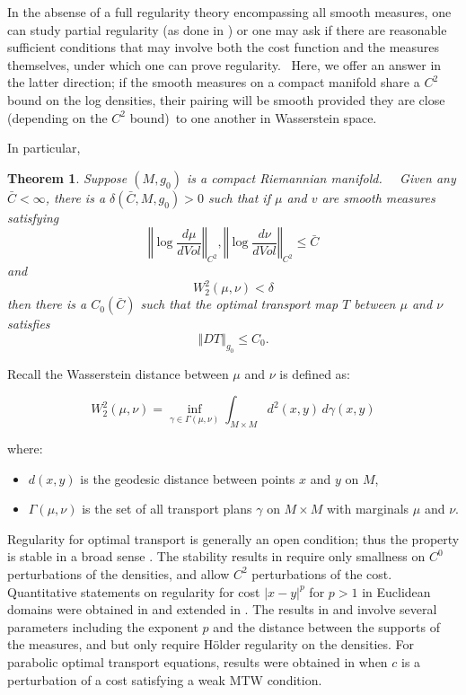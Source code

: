 \documentclass[11pt,letterpaper]{amsart}%
\newtheorem{theorem}{Theorem}
\numberwithin{equation}{section}
\begin{document}
In the absense of a full regularity theory encompassing all smooth measures, one can study partial regularity (as done in \cite{MR3349831}) or one may ask if there
are reasonable sufficient conditions that may involve both the cost function
and the measures themselves, under which one can prove regularity. \ Here, we
offer an answer in the latter direction; if the smooth measures on a compact manifold
share a $C^{2}$ bound on the log densities, their pairing will be smooth
provided they are close (depending on the $C^2$ bound)\ to one another in
Wasserstein space. 



In particular,

\begin{theorem}\label{main}
Suppose $\left(  M,g_{0}\right)  $ is a compact Riemannian manifold. \ \ Given
any $\bar{C}< \infty $, there is a $\delta(\bar{C},M,g_{0})>0 $ such that if $\mu$ and
$v$ are smooth measures satisfying
\[
\left\Vert \log\frac{d\mu}{dVol}\right\Vert _{C^{2}},\left\Vert \log\frac
{d\nu}{dVol}\right\Vert _{C^{2}}\leq\bar{C}%
\]
and
\[
W_2^{2}(\mu,\nu)<\delta
\]
then there is a $C_{0}(\bar{C})$ such that the optimal transport map $T$
between $\mu$ and $\nu$ satisfies%
\[
\left\Vert DT\right\Vert _{g_{0}}\leq C_{0}.
\]

\end{theorem}

Recall the Wasserstein distance between $\mu$ and $\nu$ is defined as:

\[
W_2^2(\mu, \nu) = \inf_{\gamma \in \Gamma(\mu, \nu)} \int_{M \times M} d^2(x, y) \, d\gamma(x, y)
\]

where:
\begin{itemize}
  \item $d(x, y)$ is the geodesic distance between points $x$ and $y$ on $M$,
  \item $\Gamma(\mu, \nu)$ is the set of all transport plans  $\gamma$ on $M \times M$ with marginals $\mu$ and $\nu$.
\end{itemize}



Regularity for optimal transport is generally an open condition; thus the property is stable in  a broad sense \cite{CF}.  The stability results in \cite{CF} require only smallness on $C^0$ perturbations of the densities, and allow $C^2$ perturbations of the cost.   Quantitative statements on regularity for cost $|x-y|^p$ for $p>1$ in Euclidean domains were obtained in \cite{CGN} and extended in \cite{CF2}. The results in  \cite{CGN} and  \cite{CF2} involve several parameters including the exponent $p$ and the distance between the supports of the measures, and but only require H\"older regularity on the densities.    For parabolic optimal transport equations, results were obtained in \cite{AK} when $c$ is a perturbation of a cost satisfying a weak MTW condition.    
\end{document}
